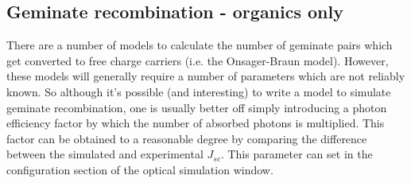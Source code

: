 
\subsection{Geminate recombination - organics only}

There are a number of models to calculate the number of geminate pairs which get converted to free charge carriers (i.e. the Onsager-Braun model).  However, these models will generally require a number of parameters which are not reliably known. So although it's possible (and interesting) to write a model to simulate geminate recombination, one is usually better off simply introducing a photon efficiency factor by which the number of absorbed photons is multiplied. This factor can be obtained to a reasonable degree by comparing the difference between the simulated and experimental $J_{sc}$.  This parameter can set in the configuration section of the optical simulation window.

